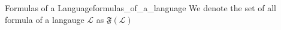 \begin{definition}{Formulas of a Language}{formulas_of_a_language}
We denote the set of all formula of a langauge $ \mathcal{ L }   $ as $ \mathfrak{ F }  \left( \mathcal{ L }   \right)  $ 
\end{definition}
